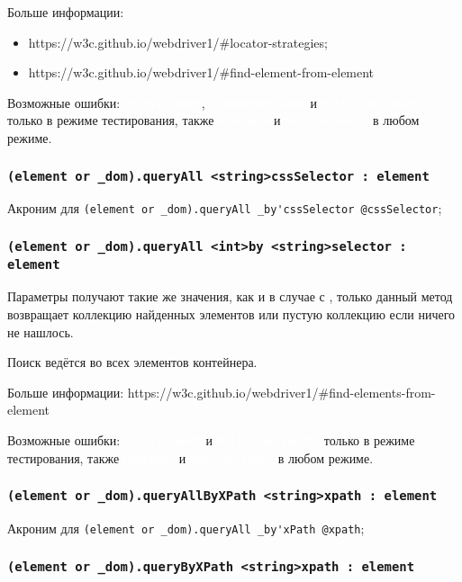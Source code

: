 \documentclass[a4paper, 14pt]{extarticle}
\newcommand{\ferror}[1]{{\fontsize{11pt}{12pt} \tt \colorbox{function}{\textcolor{white}{#1}}}}
\newenvironment{icItems}
	{ \begin{itemize} [noitemsep,nolistsep] }
	{ \end{itemize} }
\begin{document}
Больше информации:
\begin{icItems}
\item https://w3c.github.io/webdriver1/\#locator-strategies;
\item https://w3c.github.io/webdriver1/\#find-element-from-element
\end{icItems}

Возможные ошибки: \ferror{EmptyElement}, \ferror{ElementNotFound} и \ferror{MultipleElements} только в режиме тестирования, также \ferror{NoWindow} и \ferror{NoSuchElement} в любом режиме.

\subsubsection{\lstinline|(element or _dom).queryAll <string>cssSelector : element|}

Акроним для \lstinline|(element or _dom).queryAll _by'cssSelector @cssSelector|;

\subsubsection{\lstinline|(element or _dom).queryAll <int>by <string>selector : element|}

Параметры получают такие же значения, как и в случае с , только данный метод возвращает коллекцию найденных элементов или пустую коллекцию если ничего не нашлось.

\code{[icL]} Поиск ведётся во всех элементов контейнера.

Больше информации: https://w3c.github.io/webdriver1/\#find-elements-from-element

Возможные ошибки: \ferror{EmptyElement} и \ferror{MultipleElements} только в режиме тестирования, также \ferror{NoWindow} и \ferror{NoSuchElement} в любом режиме.

\subsubsection{\lstinline|(element or _dom).queryAllByXPath <string>xpath : element|}

Акроним для \lstinline|(element or _dom).queryAll _by'xPath @xpath|;

\subsubsection{\lstinline|(element or _dom).queryByXPath <string>xpath : element|}
\end{document}
